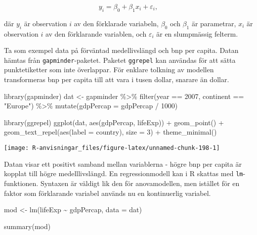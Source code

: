 \documentclass[
]{book}
\newenvironment{Shaded}{\begin{snugshade}}{\end{snugshade}}
\newcommand{\AttributeTok}[1]{\textcolor[rgb]{0.77,0.63,0.00}{#1}}
\newcommand{\DecValTok}[1]{\textcolor[rgb]{0.00,0.00,0.81}{#1}}
\newcommand{\FunctionTok}[1]{\textcolor[rgb]{0.00,0.00,0.00}{#1}}
\newcommand{\NormalTok}[1]{#1}
\newcommand{\OtherTok}[1]{\textcolor[rgb]{0.56,0.35,0.01}{#1}}
\newcommand{\SpecialCharTok}[1]{\textcolor[rgb]{0.00,0.00,0.00}{#1}}
\newcommand{\StringTok}[1]{\textcolor[rgb]{0.31,0.60,0.02}{#1}}
\theoremstyle{definition}
\theoremstyle{definition}
\theoremstyle{definition}
\theoremstyle{definition}
\theoremstyle{remark}
\begin{document}
\[y_{i} = \beta_0 + \beta_1 x_i + \varepsilon_i,\]

där \(y_i\) är observation \(i\) av den förklarade variabeln, \(\beta_0\) och \(\beta_1\) är parametrar, \(x_i\) är observation \(i\) av den förklarande variablen, och \(\varepsilon_i\) är en slumpmässig felterm.

Ta som exempel data på förväntad medellivslängd och bnp per capita. Datan hämtas från \texttt{gapminder}-paketet. Paketet \texttt{ggrepel} kan användas för att sätta punktetiketter som inte överlappar. För enklare tolkning av modellen transformeras bnp per capita till att vara i tusen dollar, snarare än dollar.

\begin{Shaded}
\begin{Highlighting}[]
\FunctionTok{library}\NormalTok{(gapminder)}
\NormalTok{dat }\OtherTok{\textless{}{-}}\NormalTok{ gapminder }\SpecialCharTok{\%\textgreater{}\%} 
  \FunctionTok{filter}\NormalTok{(year }\SpecialCharTok{==} \DecValTok{2007}\NormalTok{, continent }\SpecialCharTok{==} \StringTok{"Europe"}\NormalTok{) }\SpecialCharTok{\%\textgreater{}\%} 
  \FunctionTok{mutate}\NormalTok{(}\AttributeTok{gdpPercap =}\NormalTok{ gdpPercap }\SpecialCharTok{/} \DecValTok{1000}\NormalTok{)}

\FunctionTok{library}\NormalTok{(ggrepel)}
\FunctionTok{ggplot}\NormalTok{(dat, }\FunctionTok{aes}\NormalTok{(gdpPercap, lifeExp)) }\SpecialCharTok{+}
  \FunctionTok{geom\_point}\NormalTok{() }\SpecialCharTok{+}
  \FunctionTok{geom\_text\_repel}\NormalTok{(}\FunctionTok{aes}\NormalTok{(}\AttributeTok{label =}\NormalTok{ country), }\AttributeTok{size =} \DecValTok{3}\NormalTok{) }\SpecialCharTok{+}
  \FunctionTok{theme\_minimal}\NormalTok{()}
\end{Highlighting}
\end{Shaded}

\begin{center}\texttt{[image: R-anvisningar\_files/figure-latex/unnamed-chunk-198-1]} \end{center}

Datan visar ett positivt samband mellan variablerna - högre bnp per capita är kopplat till högre medelllivslängd. En regressionmodell kan i R skattas med \texttt{lm}-funktionen. Syntaxen är väldigt lik den för anovamodellen, men istället för en faktor som förklarande variabel används nu en kontinuerlig variabel.

\begin{Shaded}
\begin{Highlighting}[]
\NormalTok{mod }\OtherTok{\textless{}{-}} \FunctionTok{lm}\NormalTok{(lifeExp }\SpecialCharTok{\textasciitilde{}}\NormalTok{ gdpPercap, }\AttributeTok{data =}\NormalTok{ dat)}

\FunctionTok{summary}\NormalTok{(mod)}
\end{Highlighting}
\end{Shaded}
\end{document}
